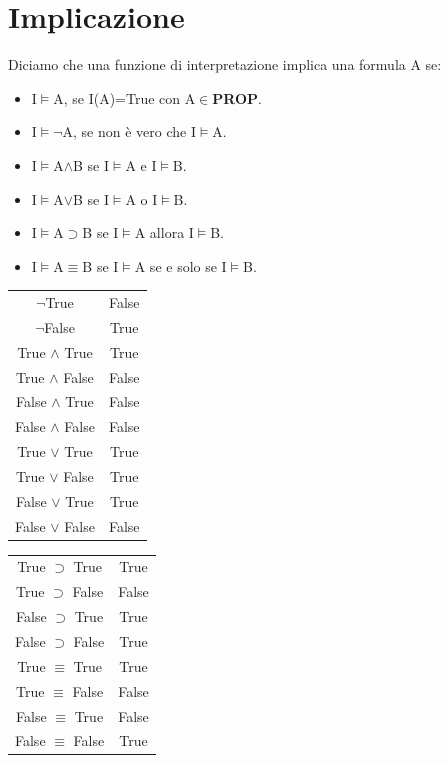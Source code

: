 \documentclass[../main.tex]{subfiles}
\begin{document}
    \section{Implicazione}
    Diciamo che una funzione di interpretazione implica una formula A se:
    \begin{itemize}
        \item I$\models$A, se I(A)=True con A$\in$\textbf{PROP}.
        \item I$\models \lnot$A, se non è vero che I$\models$A.
        \item I$\models$A$\land$B se I$\models$A e I$\models$B.
        \item I$\models$A$\lor$B se I$\models$A o I$\models$B.
        \item I$\models$A$\supset$B se I$\models$A allora I$\models$B.
        \item I$\models$A$\equiv$B se I$\models$A se e solo se I$\models$B.
    \end{itemize}
    \begin{minipage}{0.5\textwidth}
        \begin{tabular}{|c|c|}
            \hline
            $\lnot$True & False\\
            $\lnot$False & True\\
            \hline
            True $\land$ True & True\\
            True $\land$ False & False\\
            False $\land$ True & False\\
            False $\land$ False & False\\
            \hline
            True $\lor$ True & True\\
            True $\lor$ False & True\\
            False $\lor$ True & True\\
            False $\lor$ False & False\\
            \hline
        \end{tabular}
    \end{minipage}
    \begin{minipage}{0.5\textwidth}
        \begin{tabular}{|c|c|}
            \hline
            True $\supset$ True & True\\
            True $\supset$ False & False\\
            False $\supset$ True & True\\
            False $\supset$ False & True\\
            \hline
            True $\equiv$ True & True\\
            True $\equiv$ False & False\\
            False $\equiv$ True & False\\
            False $\equiv$ False & True\\
            \hline
        \end{tabular}
    \end{minipage}
\end{document}
